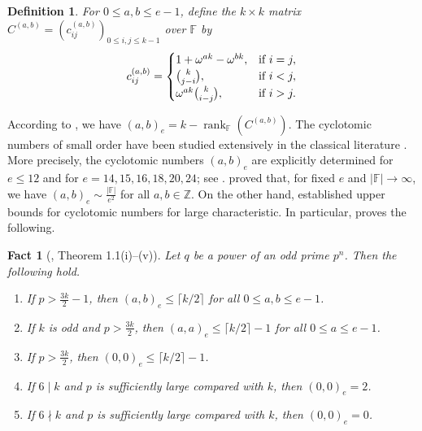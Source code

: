 \documentclass[10pt,a4paper]{article}
\newtheorem{defi}[thm]{Definition}
\newtheorem{fac}[thm]{Fact}
\newcommand{\rank}{\operatorname{rank}}
\numberwithin{equation}{section}
\begin{document}
\begin{defi}
For $0\le a,b\le e-1$, define the $k\times k$ matrix $C^{(a,b)}=(c_{ij}^{(a,b)})_{0\le i,j\le k-1}$ over $\mathbb{F}$ by
\[
  c_{ij}^{(a,b)}=
  \begin{cases}
    1+\omega^{ak}-\omega^{bk}, & \textup{if } i=j,\\
    \binom{k}{j-i}, & \textup{if } i<j,\\
    \omega^{ak}\binom{k}{i-j}, & \textup{if } i>j.
  \end{cases}
\]
\end{defi}
According to \cite[Lemma 3.1]{BetsumiyaHirasakaKomatsuMunemasa2013}, we have $(a,b)_e=k-\rank_{\mathbb{F}}(C^{(a,b)})$. The cyclotomic numbers of small order have been studied extensively in the classical literature \cite{BaumertFredricksen1967,EvansHill1979,Lehmer1954,LehmerVandiver1957,Whiteman1957,Wilson1972}. More precisely, the cyclotomic numbers $(a,b)_e$ are explicitly determined for $e\le 12$ and for $e=14,15,16,18,20,24$; see \cite[p.~152]{BerndtEvansWilliams1998}.  \cite{Katre1989} proved that, for fixed $e$ and $|\mathbb{F}|\to\infty$, we have $(a,b)_e\sim \frac{|\mathbb{F}|}{e^2}$ for all $a,b\in \mathbb{Z}$. On the other hand, \cite{BetsumiyaHirasakaKomatsuMunemasa2013,DoDucLeungSchmidt2020} established upper bounds for cyclotomic numbers for large characteristic. In particular, \cite[Theorem 1.1(i)--(v)]{BetsumiyaHirasakaKomatsuMunemasa2013} proves the following.

\begin{fac}[\cite{BetsumiyaHirasakaKomatsuMunemasa2013}, Theorem 1.1(i)--(v)]
Let $q$ be a power of an odd prime $p^{n}$. Then the following hold.
\begin{enumerate}
\item[\textup{(i)}] If $p>\frac{3k}{2}-1$, then $(a,b)_{e}\le \lceil k/2\rceil$ for all $0\le a,b\le e-1$.
\item[\textup{(ii)}] If $k$ is odd and $p>\frac{3k}{2}$, then $(a,a)_{e}\le \lceil k/2\rceil-1$ for all $0\le a\le e-1$.
\item[\textup{(iii)}] If $p>\frac{3k}{2}$, then $(0,0)_{e}\le \lceil k/2\rceil-1$.
\item[\textup{(iv)}] If $6\mid k$ and $p$ is sufficiently large compared with $k$, then $(0,0)_{e}=2$.
\item[\textup{(v)}] If $6\nmid k$ and $p$ is sufficiently large compared with $k$, then $(0,0)_{e}=0$.
\end{enumerate}
\end{fac}
\end{document}
